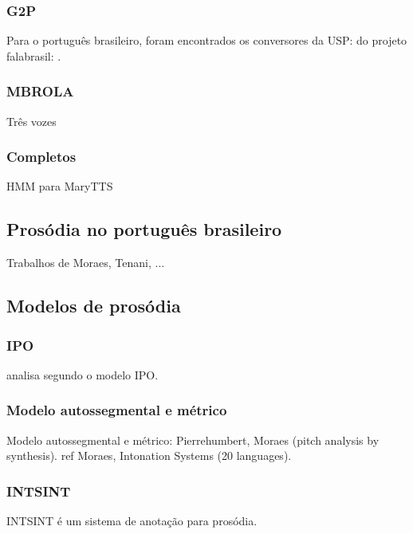 \subsubsection{G2P}
Para o português brasileiro, foram encontrados os conversores
da USP: \cite{g2pusp} do projeto falabrasil: \cite{falabrasil}.
\subsubsection{MBROLA}
Três vozes
\subsubsection{Completos}
HMM para MaryTTS

\subsection{Prosódia no português brasileiro}
Trabalhos de Moraes, Tenani, ...
\subsection{Modelos de prosódia}
\subsubsection{IPO}
\cite{ipo} analisa segundo o modelo IPO.
\subsubsection{Modelo autossegmental e métrico}
Modelo autossegmental e métrico: Pierrehumbert, Moraes (pitch analysis by synthesis).
ref Moraes, Intonation Systems (20 languages).
\subsubsection{INTSINT}
INTSINT é um sistema de anotação para prosódia.
